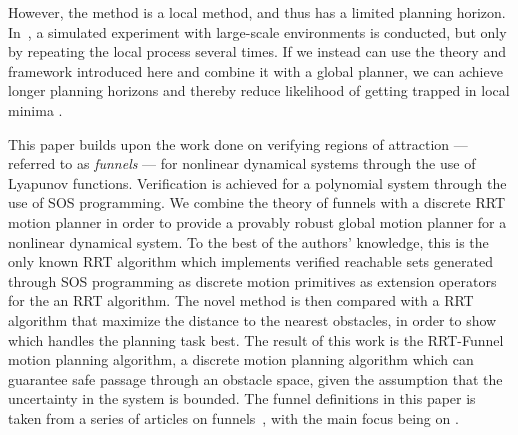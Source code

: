 However, the method is a local method, and thus has a limited planning horizon.
In~\cite{majumdarFunnelLibrariesRealtime2017}, a simulated experiment with
large-scale environments is conducted, but only by repeating the local process
several times. If we instead can use the theory and framework introduced here
and combine it with a global planner, we can achieve longer planning horizons
and thereby reduce likelihood of getting trapped in local minima .

This paper builds upon the work done on verifying regions of attraction ---
referred to as \emph{funnels} --- for nonlinear dynamical systems through the
use of Lyapunov functions. Verification is achieved for a polynomial system
through the use of SOS programming. We combine the theory of funnels with a
discrete RRT motion planner in order to provide a provably robust global motion
planner for a nonlinear dynamical system. To the best of the authors' knowledge,
this is the only known RRT algorithm which implements verified reachable sets
generated through SOS programming as discrete motion primitives as extension
operators for the an RRT algorithm. The novel method is then compared with a RRT
algorithm that maximize the distance to the nearest obstacles, in order to show
which handles the planning task best. The result of this work is the RRT-Funnel
motion planning algorithm, a discrete motion planning algorithm which can
guarantee safe passage through an obstacle space, given the assumption that the
uncertainty in the system is bounded. The funnel definitions in this paper is
taken from a series of articles on
funnels~\cite{Tobenkin_2011,tedrakeLQRtreesFeedbackMotion2009,
  majumdarRobustOnlineMotion2013,
  majumdarFunnelLibrariesRealtime2017,ahmadi2014dsos}, with the main focus being
on \cite{majumdarFunnelLibrariesRealtime2017}.



